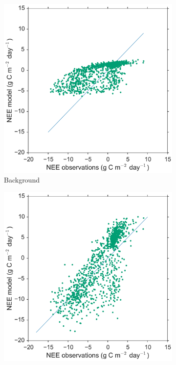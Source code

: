\documentclass[review]{elsarticle}
\begin{document}
\begin{figure}
    \centering
     \begin{subfigure}[b]{0.4\textwidth}
        \includegraphics[width=\textwidth]{xbfscat2.pdf}
        \caption{Background}
        \label{fig:forecastscatxb}
    \end{subfigure}
    \begin{subfigure}[b]{0.4\textwidth}
        \includegraphics[width=\textwidth]{Afscat2.pdf}

\end{subfigure}
\end{figure}
\end{document}
